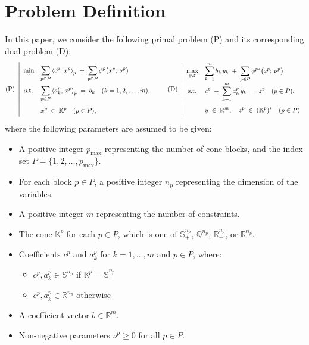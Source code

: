 \section{Problem Definition}

In this paper, we consider the following primal problem (P) and its corresponding dual problem (D):
\begin{equation*}
    \everymath{\displaystyle}
    \renewcommand{\arraystretch}{2.0}
    \text{(P)}~
    \left|
    \begin{array}{cl}
         \min_{x} & \displaystyle 
             \sum_{p \in P} \inprod{c^p}{x^p}_p 
             \;+\;\sum_{p \in P} \phi^p\bigl(x^p;\,\nu^p\bigr) \\[3pt]
         \text{s.t.} 
         & \displaystyle 
             \sum_{p \in P} \inprod{a^p_{k}}{x^p}_p 
             \;=\; b_k \quad (k= 1,2,\ldots,m), \\[3pt]
         & x^p \;\in\; \mathbb{K}^p \quad (p\in P),
    \end{array}
    \right.
    \qquad
    \text{(D)}~
    \left|
    \begin{array}{cl}
         \max_{y,z} & \displaystyle 
            \sum_{k=1}^m b_k\, y_k 
            \;+\;\sum_{p \in P} \phi^{p*}\bigl(z^p;\,\nu^p\bigr) \\[3pt]
         \text{s.t.} 
         & \displaystyle 
            c^p \;-\; \sum_{k=1}^m a^p_k\,y_k \;=\; z^p \quad (p\in P), \\[3pt]
         & y \;\in\; \mathbb{R}^m, \quad z^p \;\in\; (\mathbb{K}^p)^* \quad (p\in P)
    \end{array}
    \right.
\end{equation*}
where the following parameters are assumed to be given:
\begin{itemize}
    \item A positive integer $p_{\max}$ representing the number of cone blocks, and the index set $P = \{1, 2, \ldots, p_{\max}\}$.
    \item For each block $p \in P$, a positive integer $n_p$ representing the dimension of the variables.
    \item A positive integer $m$ representing the number of constraints.
    \item The cone $\mathbb{K}^p$ for each $p \in P$, which is one of $\mathbb{S}^{n_p}_+$, $\mathbb{Q}^{n_p}$, $\mathbb{R}^{n_p}_+$, or $\mathbb{R}^{n_p}$.
    \item Coefficients $c^p$ and $a^p_k$ for $k = 1, \ldots, m$ and $p \in P$, where:
      \begin{itemize}
          \item $c^p, a^p_k \in \mathbb{S}^{n_p}$ if $\mathbb{K}^p = \mathbb{S}^{n_p}_+$
          \item $c^p, a^p_k \in \mathbb{R}^{n_p}$ otherwise
      \end{itemize}
    \item A coefficient vector $b \in \mathbb{R}^m$.
    \item Non-negative parameters $\nu^p \ge 0$ for all $p \in P$.
\end{itemize}
